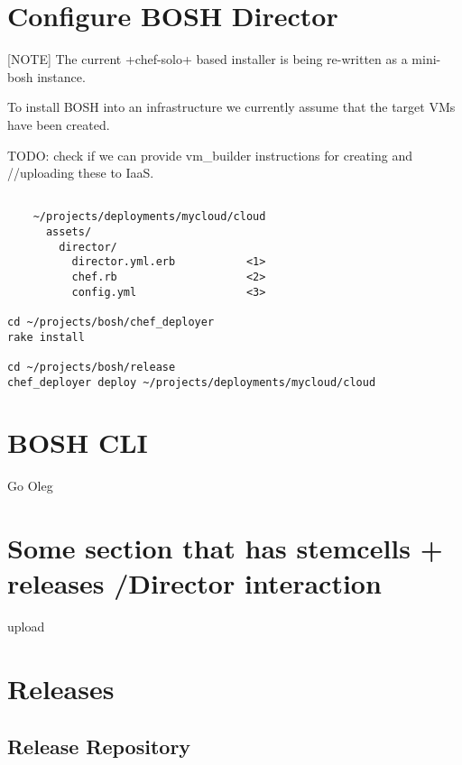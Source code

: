 \chapter{Configure BOSH Director}
\label{configureboshdirector}

[NOTE]
The current +chef-solo+ based installer is being re-written as a
mini-bosh instance.

To install BOSH into an infrastructure we currently assume that the
target VMs have been created.

TODO: check if we can provide vm\_builder instructions for creating and
/\slash uploading these to IaaS.

\begin{adjustwidth}{2.5em}{2.5em}
\begin{verbatim}

    ~/projects/deployments/mycloud/cloud
      assets/
        director/
          director.yml.erb           <1>
          chef.rb                    <2>
          config.yml                 <3>

cd ~/projects/bosh/chef_deployer
rake install

cd ~/projects/bosh/release
chef_deployer deploy ~/projects/deployments/mycloud/cloud

\end{verbatim}
\end{adjustwidth}

\chapter{BOSH CLI}
\label{boshcli}

Go Oleg

\chapter{Some section that has stemcells + releases \slash  Director interaction}
\label{somesectionthathasstemcellsreleasesdirectorinteraction}

upload

\chapter{Releases}
\label{releases}

\section{Release Repository}
\label{releaserepository}

